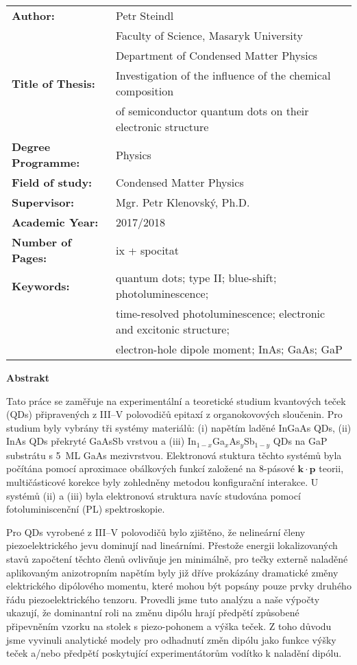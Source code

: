 \documentclass[
a4paper, %
11pt, %
onecolumn, %
openany, %
oldfontcommands,
]{memoir}
\begin{document}
\normalsize
\begin{tabular}{ll}
	\textbf{Author:} & Petr Steindl \\[-0.5cm]
	& Faculty of Science, Masaryk University \\[-0.5cm]
	& Department of Condensed Matter Physics \\[-0.5cm]
	\textbf{Title of Thesis:} &  Investigation of the influence of the chemical composition \\[-0.5cm]
	& of semiconductor quantum dots on their electronic structure\\
	\textbf{Degree Programme:}& Physics \\
	\textbf{Field of study:}& Condensed Matter Physics \\
	\textbf{Supervisor:}& Mgr. Petr Klenovský, Ph.D. \\
	\textbf{Academic Year:}& 2017/2018 \\
	\textbf{Number of Pages:}& ix + spocitat \\
	\textbf{Keywords:}& quantum dots; type II; blue-shift; photoluminescence; \\[-0.5cm]
	&time-resolved photoluminescence; electronic and excitonic structure;\\[-0.5cm]
	& electron-hole dipole moment; InAs; GaAs; GaP \\
\end{tabular}
\renewcommand{\arraystretch}{1} 
\newpage

\cleardoublepage

\noindent\Large\textbf{Abstrakt}\\ \normalsize

\noindent Tato práce se zaměřuje na experimentální a teoretické studium kvantových teček (QDs) připravených z III--V polovodičů epitaxí z organokovových sloučenin. Pro studium byly vybrány tři systémy materiálů: (i) napětím laděné InGaAs QDs, (ii) InAs QDs překryté GaAsSb vrstvou a (iii) In$_{1-x}$Ga$_x$As$_y$Sb$_{1-y}$ QDs na GaP substrátu s 5~ML GaAs mezivrstvou. Elektronová stuktura těchto systémů byla počítána pomocí aproximace obálkových funkcí založené na 8-pásové $\mathbf{k\cdot p}$ teorii, multičásticové korekce byly zohledněny metodou konfigurační interakce. U systémů (ii) a (iii) byla elektronová struktura navíc studována pomocí fotoluminiscenční (PL) spektroskopie. 

Pro QDs vyrobené z III--V polovodičů bylo zjištěno, že nelineární členy piezoelektrického jevu dominují nad lineárními. Přestože energii lokalizovaných stavů započtení těchto členů ovlivňuje jen minimálně, pro tečky externě naladěné aplikovaným anizotropním napětím byly již dříve prokázány dramatické změny elektrického dipólového momentu, které mohou být popsány pouze prvky druhého řádu piezoelektrického tenzoru. Provedli jsme tuto analýzu a naše výpočty ukazují, že dominantní roli na změnu dipólu hrají předpětí způsobené připevněním vzorku na stolek s piezo-pohonem a výška teček. Z toho důvodu jsme vyvinuli analytické modely pro odhadnutí změn dipólu jako funkce výšky teček a/nebo předpětí poskytující experimentátorům vodítko k naladění dipólu.
\end{document}
